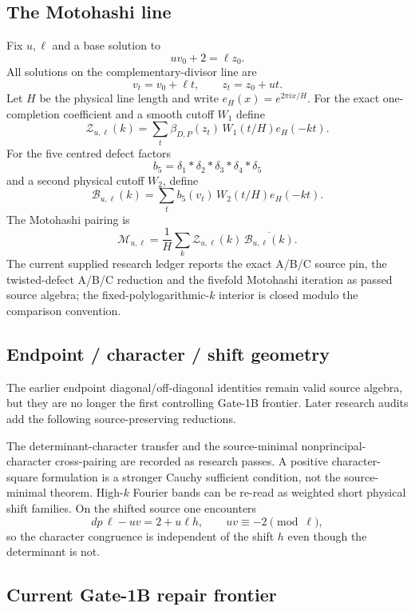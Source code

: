 \documentclass[11pt]{article}
\theoremstyle{definition}
\newcommand{\1}{\mathbf 1}
\begin{document}
\subsection{The Motohashi line}

Fix $u,\ell$ and a base solution to
\[
\boxed{uv_0+2=\ell z_0.}
\tag{G1B-base}
\]
All solutions on the complementary-divisor line are
\[
\boxed{
v_t=v_0+\ell t,\qquad
z_t=z_0+ut.
}
\tag{G1B-line}
\]
Let $H$ be the physical line length and write $e_H(x)=e^{2\pi ix/H}$.
For the exact one-completion coefficient and a smooth cutoff $W_1$ define
\[
\boxed{
\mathcal Z_{u,\ell}(k)
=
\sum_t
\beta_{D,P}(z_t)\,
W_1(t/H)e_H(-kt).
}
\tag{G1B-Z}
\]
For the five centred defect factors
\[
b_5=\delta_1*\delta_2*\delta_3*\delta_4*\delta_5
\]
and a second physical cutoff $W_2$, define
\[
\boxed{
\mathcal B_{u,\ell}(k)
=
\sum_t
b_5(v_t)\,
W_2(t/H)e_H(-kt).
}
\tag{G1B-B}
\]
The Motohashi pairing is
\[
\boxed{
\mathcal M_{u,\ell}
=
\frac1H
\sum_k
\mathcal Z_{u,\ell}(k)\,
\overline{\mathcal B_{u,\ell}(k)}.
}
\tag{G1B-M}
\]
The current supplied research ledger reports the exact A/B/C source pin, the twisted-defect
A/B/C reduction and the fivefold Motohashi iteration as passed source algebra; the
fixed-polylogarithmic-$k$ interior is closed modulo the comparison convention.

\subsection{Endpoint / character / shift geometry}

The earlier endpoint diagonal/off-diagonal identities remain valid source algebra, but they
are no longer the first controlling Gate-1B frontier.  Later research audits add the
following source-preserving reductions.

The determinant-character transfer and the source-minimal nonprincipal-character
cross-pairing are recorded as research passes.  A positive character-square formulation is
a stronger Cauchy sufficient condition, not the source-minimal theorem.  High-$k$ Fourier
bands can be re-read as weighted short physical shift families.  On the shifted source one
encounters
\[
dp\,\ell-uv = 2+u\ell h,
\qquad
uv\equiv -2\pmod\ell,
\]
so the character congruence is independent of the shift $h$ even though the determinant is
not.

\subsection{Current Gate-1B repair frontier}
\end{document}

